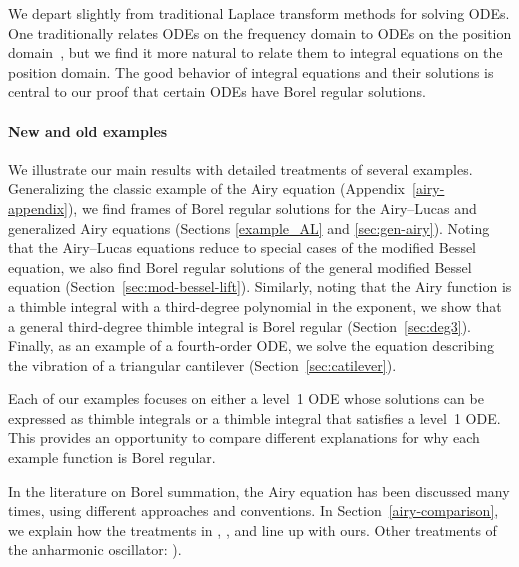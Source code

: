 \documentclass{article}
\theoremstyle{definition}
\theoremstyle{plain}
\newenvironment{todo}{\color{Coral}}{\color{black}}
\begin{document}
We depart slightly from traditional Laplace transform methods for solving ODEs. One traditionally relates ODEs on the frequency domain to ODEs on the position domain~\cite{braaksma2006laplace,laplace-tfm}, but we find it more natural to relate them to integral equations on the position domain. The good behavior of integral equations and their solutions is central to our proof that certain ODEs have Borel regular solutions.
%
\paragraph{New and old examples}
%
We illustrate our main results with detailed treatments of several examples. Generalizing the classic example of the Airy equation (Appendix~\ref{airy-appendix}), we find frames of Borel regular solutions for the Airy--Lucas and generalized Airy equations (Sections \ref{example_AL} and \ref{sec:gen-airy}). Noting that the Airy--Lucas equations reduce to special cases of the modified Bessel equation, we also find Borel regular solutions of the general modified Bessel equation (Section~\ref{sec:mod-bessel-lift}). Similarly, noting that the Airy function is a thimble integral with a third-degree polynomial in the exponent, we show that a general third-degree thimble integral is Borel regular (Section~\ref{sec:deg3}). Finally, as an example of a fourth-order ODE, we solve the equation describing the vibration of a triangular cantilever (Section~\ref{sec:catilever}).

Each of our examples focuses on either a level~1 ODE whose solutions can be expressed as thimble integrals or a thimble integral that satisfies a level~1 ODE. This provides an opportunity to compare different explanations for why each example function is Borel regular.

In the literature on Borel summation, the Airy equation has been discussed many times, using different approaches and conventions. In Section~\ref{airy-comparison}, we explain how the treatments in \cite[Section 2.2]{lectures-Marino}, \cite[Section 6.14]{diverg-resurg-i}, and \cite[Section 2.2]{kawai-takei} line up with ours.
 \begin{todo}Other treatments of the anharmonic oscillator: \cite{bender-wu}\cite[Appendix B]{aniceto2019primer}\cite[Section 2.5.3]{sternin1995borel}).\end{todo}
%
\end{document}
